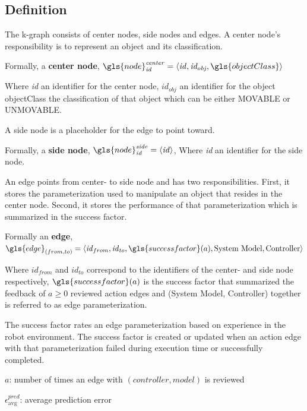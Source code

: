 \subsection{Definition}%
\label{subsec:k-graph_definition}
The \ac{k-graph} consists of center nodes, side nodes and edges. A center node's responsibility is to represent an object and its classification.\bs

Formally, a \textbf{center node}, $\gls{node}^{\mathit{center}}_\mathit{id} =\left\langle \mathit{id}, \mathit{id_{obj}}, \gls{objectClass} \right\rangle $\bs

Where \textit{id} an identifier for the center node, $\mathit{id_{obj}}$ an identifier for the object\\\gls{objectClass} the classification of that object which can be either MOVABLE or UNMOVABLE.\bs

\noindent A side node is a placeholder for the edge to point toward.\bs

Formally, a \textbf{side node}, $\gls{node}^{\mathit{side}}_\mathit{id} =\left\langle \mathit{id} \right\rangle $, Where \textit{id} an identifier for the side node.\bs

\noindent An edge points from center- to side node and has two responsibilities. First, it stores the parameterization used to manipulate an object that resides in the center node. Second, it stores the performance of that parameterization which is summarized in the success factor.\bs

Formally an \textbf{edge}, $\gls{edge}_{(from, to)} = \left\langle \mathit{id}_{from}, \mathit{id}_{to}, \gls{successfactor}(a), \textrm{System Model}, \textrm{Controller}\right\rangle$\bs

Where $\mathit{id}_\mathit{from}$ and $\mathit{id}_\mathit{to}$ correspond to the identifiers of the center- and side node respectively, $\gls{successfactor}(a)$ is the success factor that summarized the feedback of $a\geq0$ reviewed action edges and (System Model, Controller) together is referred to as edge parameterization. \bs

The success factor rates an edge parameterization based on experience in the robot environment. The success factor is created or updated when an action edge with that parameterization failed during execution time or successfully completed.\bs


$a$: number of times an edge with $(\mathit{controller}, \mathit{model})$ is reviewed\bs

$\epsilon^\mathit{pred}_\mathrm{avg}$: average prediction error 


